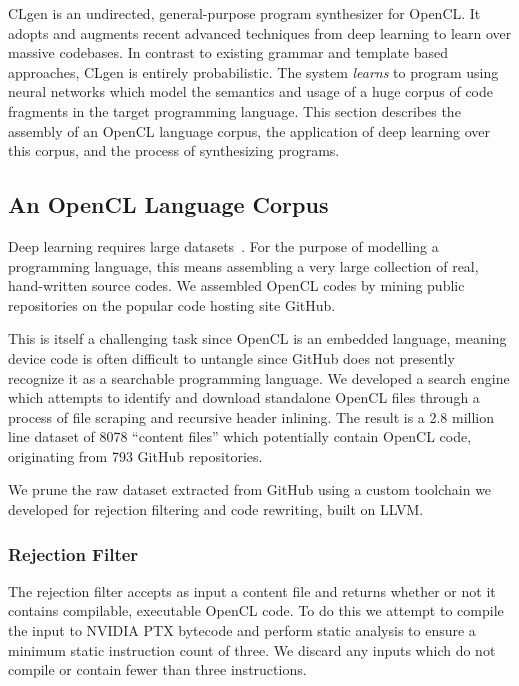 
CLgen is an undirected, general-purpose program synthesizer for OpenCL. It adopts and augments recent advanced techniques from deep learning to learn over massive codebases. In contrast to existing grammar and template based approaches, CLgen is entirely probabilistic. The system \emph{learns} to program using neural networks which model the semantics and usage of a huge corpus of code fragments in the target programming language. This section describes the assembly of an OpenCL language corpus, the application of deep learning over this corpus, and the process of synthesizing programs.

\subsection{An OpenCL Language Corpus}

Deep learning requires large datasets~\cite{LeCun2015}. For the purpose of modelling a programming language, this means assembling a very large collection of real, hand-written source codes. We assembled OpenCL codes by mining public repositories on the popular code hosting site GitHub.

This is itself a challenging task since OpenCL is an embedded language, meaning device code is often difficult to untangle since GitHub does not presently recognize it as a searchable programming language. We developed a search engine which attempts to identify and download standalone OpenCL files through a process of file scraping and recursive header inlining. The result is a 2.8 million line dataset of 8078 ``content files'' which potentially contain OpenCL code, originating from 793 GitHub repositories.

We prune the raw dataset extracted from GitHub using a custom toolchain we developed for rejection filtering and code rewriting, built on LLVM.

\subsubsection{Rejection Filter}\label{sec:rejection-filter} The rejection filter accepts as input a content file and returns whether or not it contains compilable, executable OpenCL code. To do this we attempt to compile the input to NVIDIA PTX bytecode and perform static analysis to ensure a minimum static instruction count of three. We discard any inputs which do not compile or contain fewer than three instructions.

